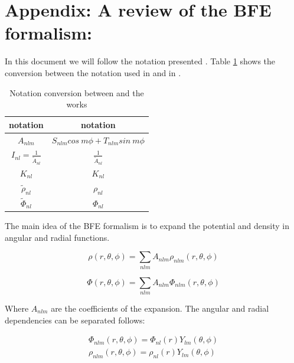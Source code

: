 \documentclass[14pt]{article}
\begin{document}



\appendix


\section*{Appendix: A review of the BFE formalism:}\label{sec:appendix}

In this document we will follow the notation presented \cite{Lowing11}. Table
\ref{tab:conversion} shows the conversion between the notation used in \cite{Hernquist92} and
in \cite{Lowing11}.

\begin{table}[h]
  \centering
  \begin{tabular}{c  c}
    \hline
    \hline
    \cite{Hernquist92} notation & \cite{Lowing11} notation \\
    \hline
    $A_{nlm}$ & $S_{nlm} cos\ m\phi + T_{nlm}sin\ m\phi $\\
    $I_{nl} = \frac{1}{\tilde{A}_{nl}}$ & $\frac{1}{\tilde{A}_{nl}}$\\
    $K_{nl}$ & $K_{nl}$ \\
    $\tilde{\rho}_{nl}$ & $\rho_{nl}$\\
    $\tilde{\Phi}_{nl}$ & $\Phi_{nl}$\\
    \hline
    \hline
  \end{tabular}
  \caption{Notation conversion between \cite{Hernquist92} and the
  \cite{Lowing11} works}\label{tab:conversion}
\end{table}



The main idea of the BFE formalism is to expand the potential and density in
angular and radial functions. 


\begin{equation}
    \rho(r, \theta, \phi) = \sum_{nlm} A_{nlm}\rho_{nlm}(r, \theta, \phi)
\end{equation}

\begin{equation}
    \Phi(r, \theta, \phi) = \sum_{nlm} A_{nlm}\Phi_{nlm}(r, \theta, \phi)
\end{equation}

Where $A_{nlm}$ are the coefficients of the expansion. The angular and radial
dependencies can be separated follows:


\begin{equation}\label{eq:potdens_nlm}
  \begin{aligned}
  \Phi_{nlm}(r, \theta, \phi) = \Phi_{nl}(r)Y_{lm}(\theta, \phi)\\ 
  \rho_{nlm}(r, \theta, \phi) = \rho_{nl}(r)Y_{lm}(\theta, \phi) 
  \end{aligned}
\end{equation}
\end{document}
